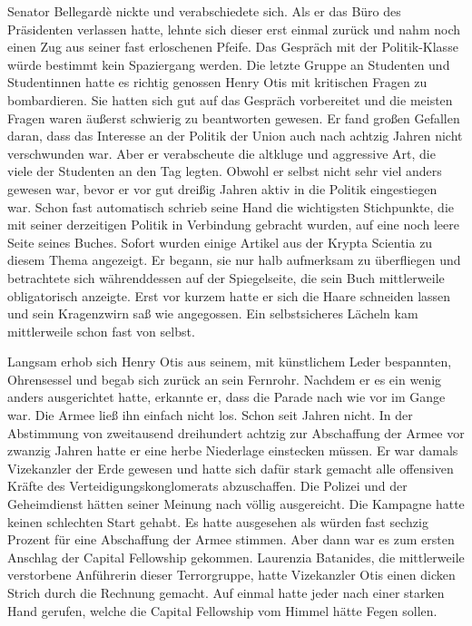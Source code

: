 Senator  Bellegardè nickte und verabschiedete sich. Als er das Büro des Präsidenten verlassen hatte, lehnte sich dieser erst einmal zurück und nahm noch einen Zug aus seiner fast erloschenen Pfeife. Das Gespräch mit der Politik-Klasse würde bestimmt kein Spaziergang werden. Die letzte Gruppe an Studenten und Studentinnen hatte es richtig genossen Henry Otis mit kritischen Fragen zu bombardieren. Sie hatten sich gut auf das Gespräch vorbereitet und die meisten Fragen waren äußerst schwierig zu beantworten gewesen. Er fand großen Gefallen daran, dass das Interesse an der Politik der Union auch nach achtzig Jahren nicht verschwunden war. Aber er verabscheute die altkluge und aggressive Art, die viele der Studenten an den Tag legten. Obwohl er selbst nicht sehr viel anders gewesen war, bevor er vor gut dreißig Jahren aktiv in die Politik eingestiegen war. Schon fast automatisch schrieb seine Hand die wichtigsten Stichpunkte, die mit seiner derzeitigen Politik in Verbindung gebracht wurden, auf eine noch leere Seite seines Buches. Sofort wurden einige Artikel aus der Krypta Scientia zu diesem Thema angezeigt. Er begann, sie nur halb aufmerksam zu überfliegen und betrachtete sich währenddessen auf der Spiegelseite, die sein Buch mittlerweile obligatorisch anzeigte. Erst vor kurzem hatte er sich die Haare schneiden lassen und sein Kragenzwirn saß wie angegossen. Ein selbstsicheres Lächeln kam mittlerweile schon fast von selbst.

\par

Langsam erhob sich Henry Otis aus seinem, mit künstlichem Leder bespannten, Ohrensessel und begab sich zurück an sein Fernrohr. Nachdem er es ein wenig anders ausgerichtet hatte, erkannte er, dass die Parade nach wie vor im Gange war. Die Armee ließ ihn einfach nicht los. Schon seit Jahren nicht. In der Abstimmung von zweitausend dreihundert achtzig zur Abschaffung der Armee vor zwanzig Jahren hatte er eine herbe Niederlage einstecken müssen. Er war damals Vizekanzler der Erde gewesen und hatte sich dafür stark gemacht alle offensiven Kräfte des Verteidigungskonglomerats abzuschaffen. Die Polizei und der Geheimdienst hätten seiner Meinung nach völlig ausgereicht. Die Kampagne hatte keinen schlechten Start gehabt. Es hatte ausgesehen als würden fast sechzig Prozent für eine Abschaffung der Armee stimmen. Aber dann war es zum ersten Anschlag der Capital Fellowship gekommen. Laurenzia Batanides, die mittlerweile verstorbene Anführerin dieser Terrorgruppe, hatte Vizekanzler Otis einen dicken Strich durch die Rechnung gemacht. Auf einmal hatte jeder nach einer starken Hand gerufen, welche die Capital Fellowship vom Himmel hätte Fegen sollen.

